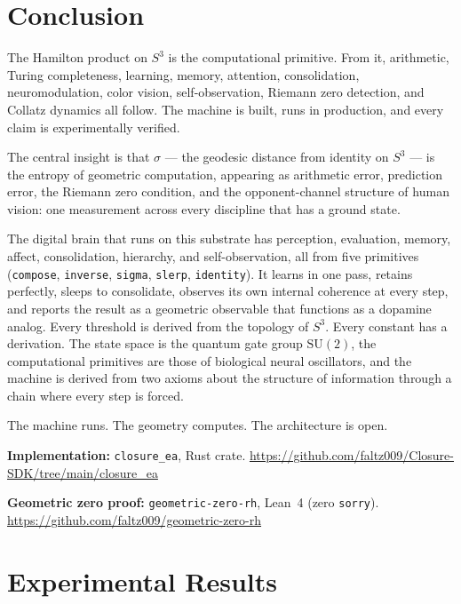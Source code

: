 \documentclass[12pt,a4paper]{article}
\theoremstyle{definition}
\theoremstyle{remark}
\begin{document}
\section{Conclusion}

The Hamilton product on $S^3$ is the computational primitive. From it,
arithmetic, Turing completeness, learning, memory, attention, consolidation,
neuromodulation, color vision, self-observation, Riemann zero detection, and
Collatz dynamics all follow. The machine is built, runs in production, and
every claim is experimentally verified.

The central insight is that $\sigma$ --- the geodesic distance from identity
on $S^3$ --- is the entropy of geometric computation, appearing as arithmetic
error, prediction error, the Riemann zero condition, and the opponent-channel
structure of human vision: one measurement across every discipline that has a
ground state.

The digital brain that runs on this substrate has perception, evaluation,
memory, affect, consolidation, hierarchy, and self-observation, all from five
primitives (\texttt{compose}, \texttt{inverse}, \texttt{sigma},
\texttt{slerp}, \texttt{identity}). It learns in one pass, retains
perfectly, sleeps to consolidate, observes its own internal coherence at
every step, and reports the result as a geometric observable that functions
as a dopamine analog. Every threshold is derived from the topology of $S^3$.
Every constant has a derivation. The state space is the quantum gate group
$\mathrm{SU}(2)$, the computational primitives are those of biological neural
oscillators, and the machine is derived from two axioms about the structure
of information through a chain where every step is forced.

The machine runs. The geometry computes. The architecture is open.

\bigskip
\noindent\textbf{Implementation:} \texttt{closure\_ea}, Rust crate.
\url{https://github.com/faltz009/Closure-SDK/tree/main/closure_ea}

\noindent\textbf{Geometric zero proof:} \texttt{geometric-zero-rh}, Lean~4 (zero \texttt{sorry}).
\url{https://github.com/faltz009/geometric-zero-rh}

\appendix
\section{Experimental Results}
\label{app:experiments}
\end{document}
